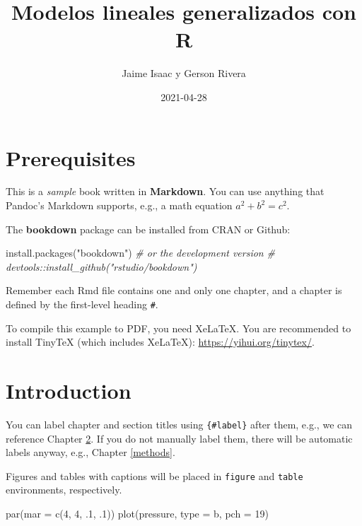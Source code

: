 \documentclass[
]{book}
\title{Modelos lineales generalizados con R}
\author{Jaime Isaac y Gerson Rivera}
\date{2021-04-28}
\newenvironment{Shaded}{\begin{snugshade}}{\end{snugshade}}
\newcommand{\AttributeTok}[1]{\textcolor[rgb]{0.77,0.63,0.00}{#1}}
\newcommand{\CommentTok}[1]{\textcolor[rgb]{0.56,0.35,0.01}{\textit{#1}}}
\newcommand{\DecValTok}[1]{\textcolor[rgb]{0.00,0.00,0.81}{#1}}
\newcommand{\FunctionTok}[1]{\textcolor[rgb]{0.00,0.00,0.00}{#1}}
\newcommand{\NormalTok}[1]{#1}
\newcommand{\StringTok}[1]{\textcolor[rgb]{0.31,0.60,0.02}{#1}}
\begin{document}
\maketitle

{
\setcounter{tocdepth}{1}
\tableofcontents
}
\hypertarget{prerequisites}{%
\chapter{Prerequisites}\label{prerequisites}}

This is a \emph{sample} book written in \textbf{Markdown}. You can use anything that Pandoc's Markdown supports, e.g., a math equation \(a^2 + b^2 = c^2\).

The \textbf{bookdown} package can be installed from CRAN or Github:

\begin{Shaded}
\begin{Highlighting}[]
\FunctionTok{install.packages}\NormalTok{(}\StringTok{"bookdown"}\NormalTok{)}
\CommentTok{\# or the development version}
\CommentTok{\# devtools::install\_github("rstudio/bookdown")}
\end{Highlighting}
\end{Shaded}

Remember each Rmd file contains one and only one chapter, and a chapter is defined by the first-level heading \texttt{\#}.

To compile this example to PDF, you need XeLaTeX. You are recommended to install TinyTeX (which includes XeLaTeX): \url{https://yihui.org/tinytex/}.

\hypertarget{intro}{%
\chapter{Introduction}\label{intro}}

You can label chapter and section titles using \texttt{\{\#label\}} after them, e.g., we can reference Chapter \ref{intro}. If you do not manually label them, there will be automatic labels anyway, e.g., Chapter \ref{methods}.

Figures and tables with captions will be placed in \texttt{figure} and \texttt{table} environments, respectively.

\begin{Shaded}
\begin{Highlighting}[]
\FunctionTok{par}\NormalTok{(}\AttributeTok{mar =} \FunctionTok{c}\NormalTok{(}\DecValTok{4}\NormalTok{, }\DecValTok{4}\NormalTok{, .}\DecValTok{1}\NormalTok{, .}\DecValTok{1}\NormalTok{))}
\FunctionTok{plot}\NormalTok{(pressure, }\AttributeTok{type =} \StringTok{\textquotesingle{}b\textquotesingle{}}\NormalTok{, }\AttributeTok{pch =} \DecValTok{19}\NormalTok{)}
\end{Highlighting}
\end{Shaded}
\end{document}
